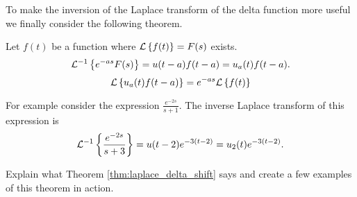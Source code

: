 To make the inversion of the Laplace transform of the delta function more useful we
finally consider the following theorem.
\begin{thm}\label{thm:laplace_delta_shift}
    Let $f(t)$ be a function where $\mathcal{L}\left\{ f(t) \right\} = F(s)$ exists. 
    \[ \mathcal{L}^{-1}\left\{ e^{-as} F(s) \right\} = u(t-a)f(t-a) = u_a(t) f(t-a). \]
    \[ \mathcal{L}\left\{ u_a(t) f(t-a) \right\} = e^{-as} \mathcal{L}\left\{ f(t) \right\} \]
\end{thm}
For example consider the expression $\frac{e^{-2s}}{s+1}$.  The inverse Laplace transform
of this expression is
\[ \mathcal{L}^{-1}\left\{ \frac{e^{-2s}}{s+3} \right\} = u(t-2) e^{-3(t-2)} = u_2(t) e^{-3(t-2)}. \]

\begin{problem}
    Explain what Theorem \ref{thm:laplace_delta_shift} says and create a few examples of
    this theorem in action.
\end{problem}

